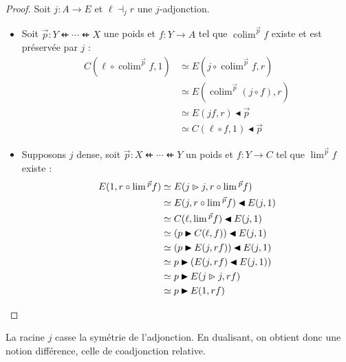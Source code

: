\documentclass[8pt,a4paper,french,draft]{article}
\newcommand{\dfrom}{\nvleftarrow}
\newcommand{\rift}{\mathbin{\blacktriangleleft}}
\newcommand{\rext}{\mathbin{\blacktriangleright}}
\newcommand{\plext}{\mathbin{{\rhd}\mathclap{\mspace{-17.5mu}\cdot}}}
\DeclareMathOperator{\colim}{colim}
\theoremstyle{plain}
\theoremstyle{definition}
\theoremstyle{remark}
\begin{document}
\begin{proof}
    Soit $j: A \to E$ et $\ell \dashv_j r$ une $j$-adjonction.
    \begin{itemize}
        \item Soit $\vec{p} : Y \dfrom \cdots \dfrom X$ une poids et $f : Y \to A$ tel que $\colim^{\vec{p}}f$ existe et est préservée par $j$ :
            \begin{align*}
                C(\ell\circ\colim^{\vec{p}}f, 1) &\simeq E(j\circ\colim^{\vec{p}}f, r)\\
                                                 &\simeq E(\colim^{\vec{p}}(j\circ f), r)\\
                                                 &\simeq E(jf, r) \rift \vec{p}\\
                                                 &\simeq C(\ell\circ f, 1) \rift \vec{p}
            \end{align*}
        \item Supposons $j$ dense, soit $\vec{p} : X \dfrom \cdots \dfrom Y$ un poids et $f : Y \to C$ tel que $\lim^{\vec{p}}f$ existe :
            \begin{align*}
                E(1, r\circ\lim{}^{\vec{p}}f) &\simeq E(j \plext j, r\circ\lim{}^{\vec{p}}f)\\
                                            &\simeq E(j , r\circ\lim{}^{\vec{p}}f) \rift E(j, 1)\\
                                            &\simeq C(\ell, \lim{}^{\vec{p}}f) \rift E(j, 1)\\
                                            &\simeq (p\rext C(\ell, f)) \rift E(j, 1)\\
                                            &\simeq (p\rext E(j, rf)) \rift E(j, 1)\\
                                            &\simeq p \rext (E(j, rf) \rift E(j, 1))\\
                                            &\simeq p \rext E(j\plext j, rf)\\
                                            &\simeq p \rext E(1, rf)
            \end{align*}
    \end{itemize}
\end{proof}

La racine $j$ casse la symétrie de l'adjonction. En dualisant, on obtient donc une notion différence, celle de coadjonction relative.
\end{document}
